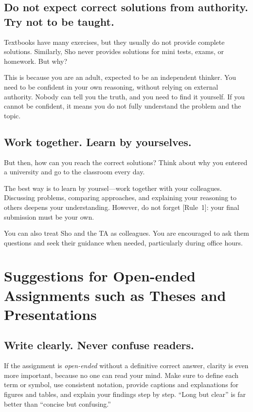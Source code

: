\documentclass[11pt,pdfa,lastpage,minititle]{MishoNote}
\def\RUL#1{\textsf{[Rule~#1]}}
\begin{document}
\subsection{Do not expect correct solutions from authority. Try not to be taught.}
Textbooks have many exercises, but they usually do not provide complete solutions.
Similarly, Sho never provides solutions for mini tests, exams, or homework. But why?


This is because you are an adult, expected to be an independent thinker.
You need to be confident in your own reasoning, without relying on external authority.
Nobody can tell you the truth, and you need to find it yourself.
If you cannot be confident, it means you do not fully understand the problem and the topic.

\OutputNote

\subsection{Work together. Learn by yourselves. }
But then, how can you reach the correct solutions? Think about why you entered a university and go to the classroom every day.

The best way is to learn by yoursel---work together with your colleagues.
Discussing problems, comparing approaches, and explaining your reasoning to others deepens your understanding.
However, do not forget \RUL{1}: your final submission must be your own.

You can also treat Sho and the TA as colleagues.
You are encouraged to ask them questions and seek their guidance when needed, particularly during office hours.



\section*{Suggestions for Open-ended Assignments such as Theses and Presentations}
\subsection{Write clearly. Never confuse readers.}
If the assignment is \emph{open-ended} without a definitive correct answer, clarity is even more important, because no one can read your mind.
Make sure to define each term or symbol, use consistent notation, provide captions and explanations for figures and tables, and explain your findings step by step.
``Long but clear'' is far better than ``concise but confusing.''
\end{document}
